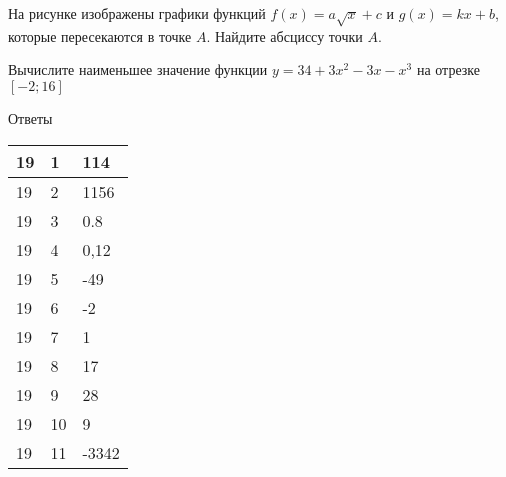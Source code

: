 \documentclass[twocolumn]{article}
\begin{document}
\begin{taskBN}{10}
На рисунке изображены графики функций $f(x)=a\sqrt{x}+c$ и $g(x)=kx+b$, которые пересекаются в точке $A$. Найдите абсциссу точки $A$.\vspace{2.5cm}
\end{taskBN}

\begin{taskBN}{11}
Вычислите наименьшее значение функции $y =34+3x^{2}-3x-x^{3}$ на отрезке $\left[-2;16 \right]$
\end{taskBN}

\newpage
 Ответы

\begin{table}[h]\begin{tabular}{|l|l|l|}
\hline
19 & 1 & 114
\\
\hline
19 & 2 & 1156
\\
\hline
19 & 3 & 0.8
\\
\hline
19 & 4 & 0,12
\\
\hline
19 & 5 & -49
\\
\hline
19 & 6 & -2
\\
\hline
19 & 7 & 1
\\
\hline
19 & 8 & 17
\\
\hline
19 & 9 & 28
\\
\hline
19 & 10 & 9
\\
\hline
19 & 11 & -3342
\\
\hline
\end{tabular}\end{table}



\newpage
\end{document}
